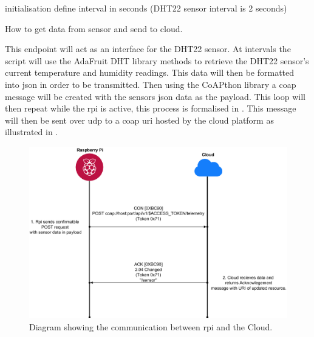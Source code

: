 \begin{center}
    \begin{algorithm}[htbp]
        initialisation\;
        define interval in seconds (DHT22 sensor interval is 2 seconds)\;
        \caption{\label{alg:get_send_data_alg}How to get data from sensor and send to cloud.}
    \end{algorithm}
\end{center}

This endpoint will act as an interface for the DHT22 sensor. 
At intervals the script will use the AdaFruit DHT library methods to retrieve 
the DHT22 sensor's current temperature and humidity readings. 
This data will then be formatted into \gls{json}
in order to be transmitted.
Then using the CoAPthon \citep{tanganelli_coapthon:_2015} library a \gls{coap} 
message will be created with the sensors \gls{json} data as the payload. 
This loop will then repeat while the \gls{rpi} is active, this process is 
formalised in .
This message will then be sent over \gls{udp} to a \gls{coap} \gls{uri} 
hosted by the cloud platform as illustrated in .

\begin{figure}[H]
    \centering
    \includegraphics[width=\imageWidth\textwidth]{assets/rpi_cloud_communication.png}
    \caption{\label{fig:rpi_cloud_comms} Diagram showing the communication between \gls{rpi} and the Cloud.}
\end{figure}

